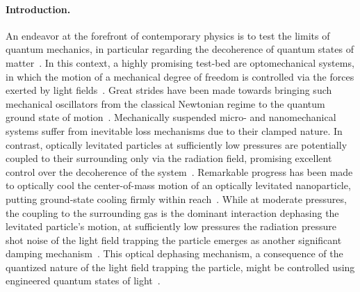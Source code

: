 \documentclass[aps,amssymb,amsmath,pra,reprint,noshowpacs]{revtex4-1}
\begin{document}
\paragraph{Introduction.}
An endeavor at the forefront of contemporary physics is to test the limits of quantum mechanics, in particular regarding the decoherence of quantum states of matter~\cite{Hornberger2003,Romero-Isart2011,Pikovski2012,Bassi2013,Pino2016}. In this context, a highly promising test-bed are optomechanical systems, in which the motion of a mechanical degree of freedom is controlled via the forces exerted by light fields~\cite{Aspelmeyer2014}. Great strides have been made towards bringing such mechanical oscillators from the classical Newtonian regime to the quantum ground state of motion~\cite{Teufel2011,Chan2011}. Mechanically suspended micro- and nanomechanical systems suffer from inevitable loss mechanisms due to their clamped nature. In contrast, optically levitated particles at sufficiently low pressures are potentially coupled to their surrounding only via the radiation field, promising excellent control over the decoherence of the system~\cite{Chang2010,Romero-Isart2011a}. Remarkable progress has been made to optically cool the center-of-mass motion of an optically levitated nanoparticle, putting ground-state cooling firmly within reach~\cite{Li2011,Gieseler2012,Millen2015,Fonseca2016,Jain2016,Vovrosh2016}. While at moderate pressures, the coupling to the surrounding gas is the dominant interaction dephasing the levitated particle's motion, at sufficiently low pressures the radiation pressure shot noise of the light field trapping the particle emerges as another significant damping mechanism~\cite{Jain2016}. This optical dephasing mechanism, a consequence of the quantized nature of the light field trapping the particle, might be controlled using engineered quantum states of light~\cite{Clark2017}.
\end{document}
